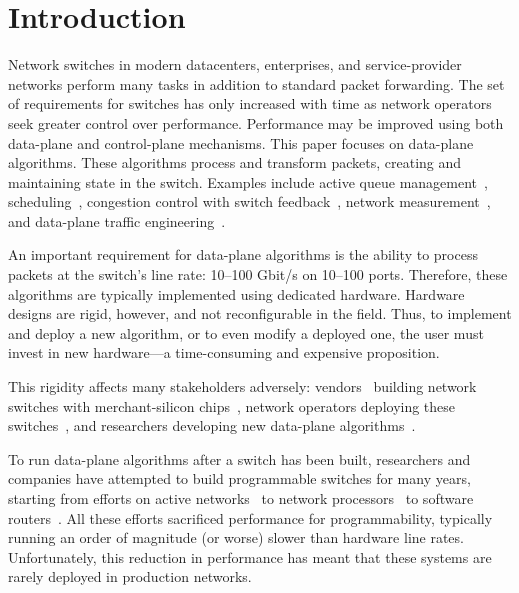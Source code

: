 \newpage
\section{Introduction}
\label{s:intro}
Network switches in modern datacenters, enterprises, and service-provider
networks perform many tasks in addition to standard packet forwarding. The set
of requirements for switches has only increased with time as network operators
seek greater control over performance.  Performance may be improved using both
data-plane and control-plane mechanisms. This paper focuses on data-plane
algorithms. These algorithms process and transform packets, creating and
maintaining state in the switch. Examples include active queue
management~\cite{red,avq,codel}, scheduling~\cite{pifo_hotnets}, congestion
control with switch feedback~\cite{xcp, rcp}, network
measurement~\cite{opensketch, bitmap_george}, and data-plane traffic
engineering~\cite{conga}.

An important requirement for data-plane algorithms is the ability to process
packets at the switch's line rate: 10--100 Gbit/s on 10--100 ports.  Therefore,
these algorithms are typically implemented using dedicated hardware.  Hardware
designs are rigid, however, and not reconfigurable in the field. Thus, to
implement and deploy a new algorithm, or to even modify a deployed one, the
user must invest in new hardware---a time-consuming and expensive proposition.

This rigidity affects many stakeholders adversely: vendors~\cite{cisco_nexus,
dell_force10, arista_7050} building network switches with merchant-silicon
chips~\cite{trident, tomahawk, mellanox}, network operators deploying these
switches~\cite{google,facebook,vl2}, and researchers developing new data-plane
algorithms~\cite{rcp, conga, xcp, bitmap_george}.

To run data-plane algorithms after a switch has been built, researchers and
companies have attempted to build programmable switches for many years,
starting from efforts on active networks~\cite{active-nets} to network
processors~\cite{ixp4xx} to software routers~\cite{click, dpdk}. All these
efforts sacrificed performance for programmability, typically running an order
of magnitude (or worse) slower than hardware line rates. Unfortunately, this
reduction in performance has meant that these systems are rarely deployed in
production networks.

